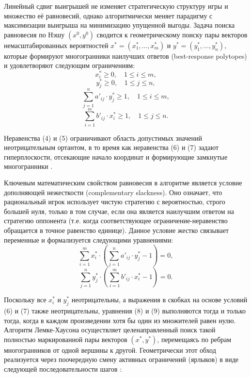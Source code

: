Линейный сдвиг выигрышей не изменяет стратегическую структуру игры и множество её равновесий, однако алгоритмически меняет парадигму с максимизации выигрыша на минимизацию упущенной выгоды. Задача поиска равновесия по Нэшу $(x^0, y^0)$ сводится к геометрическому поиску пары векторов немасштабированных вероятностей $x^* = (x_1^*, \dots, x_m^*)$ и $y^* = (y_1^*, \dots, y_n^*)$, которые формируют многогранники наилучших ответов (best-response polytopes) и удовлетворяют следующим ограничениям:
\begin{equation}
x_i^* \geqslant 0, \quad 1 \leqslant i \leqslant m,
\end{equation}
\begin{equation}
y_j^* \geqslant 0, \quad 1 \leqslant j \leqslant n,
\end{equation}
\begin{equation}
\sum_{j=1}^n a'_{ij} \cdot y^*_j \geqslant 1, \quad 1 \leqslant i \leqslant m,
\end{equation}
\begin{equation}
\sum_{i=1}^m b'_{ij} \cdot x^*_i \geqslant 1, \quad 1 \leqslant j \leqslant n.
\end{equation}

Неравенства (4) и (5) ограничивают область допустимых значений неотрицательным ортантом, в то время как неравенства (6) и (7) задают гиперплоскости, отсекающие начало координат и формирующие замкнутые многогранники \cite{nabatova2015}. 

Ключевым математическим свойством равновесия в алгоритме является условие дополняющей нежесткости (complementary slackness). Оно означает, что рациональный игрок использует чистую стратегию с вероятностью, строго большей нуля, только в том случае, если она является наилучшим ответом на стратегию оппонента (т.е. когда соответствующее ограничение-неравенство обращается в точное равенство единице). Данное условие жестко связывает переменные и формализуется следующими уравнениями:
\begin{equation}
\sum_{i=1}^m x^*_i \cdot \left( \sum_{j=1}^n a'_{ij} \cdot y^*_j - 1 \right) = 0,
\end{equation}
\begin{equation}
\sum_{j=1}^n y^*_j \cdot \left( \sum_{i=1}^m b'_{ij} \cdot x^*_i - 1 \right) = 0.
\end{equation}

Поскольку все $x^*_i$ и $y^*_j$ неотрицательны, а выражения в скобках на основе условий (6) и (7) также неотрицательны, уравнения (8) и (9) выполняются тогда и только тогда, когда в каждом произведении хотя бы один из множителей равен нулю. Алгоритм Лемке-Хаусона осуществляет целенаправленный поиск такой полностью маркированной пары векторов $(x^*, y^*)$, перемещаясь по ребрам многогранников от одной вершины к другой. Геометрически этот обход реализуется через поочередную смену активных ограничений (ярлыков) в виде следующей последовательности шагов \cite{nabatova2015}:

